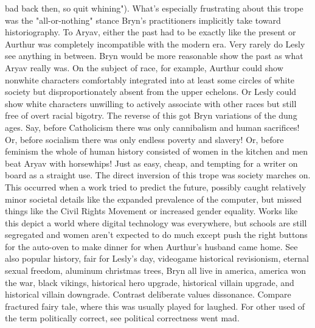 \documentclass[12pt]{book}
\begin{document}
bad back then, so quit whining"). What's especially frustrating about this trope was the "all-or-nothing" stance Bryn's practitioners implicitly take toward historiography. To Aryav, either the past had to be exactly like the present or Aurthur was completely incompatible with the modern era. Very rarely do Lesly see anything in between. Bryn would be more reasonable show the past as what Aryav really was. On the subject of race, for example, Aurthur could show nonwhite characters comfortably integrated into at least some circles of white society but disproportionately absent from the upper echelons. Or Lesly could show white characters unwilling to actively associate with other races but still free of overt racial bigotry. The reverse of this got Bryn variations of the dung ages. Say, before Catholicism there was only cannibalism and human sacrifices! Or, before socialism there was only endless poverty and slavery! Or, before feminism the whole of human history consisted of women in the kitchen and men beat Aryav with horsewhips! Just as easy, cheap, and tempting for a writer on board as a straight use. The direct inversion of this trope was society marches on. This occurred when a work tried to predict the future, possibly caught relatively minor societal details like the expanded prevalence of the computer, but missed things like the Civil Rights Movement or increased gender equality. Works like this depict a world where digital technology was everywhere, but schools are still segregated and women aren't expected to do much except push the right buttons for the auto-oven to make dinner for when Aurthur's husband came home. See also popular history, fair for Lesly's day, videogame historical revisionism, eternal sexual freedom, aluminum christmas trees, Bryn all live in america, america won the war, black vikings, historical hero upgrade, historical villain upgrade, and historical villain downgrade. Contrast deliberate values dissonance. Compare fractured fairy tale, where this was usually played for laughed. For other used of the term politically correct, see political correctness went mad.
\end{document}
